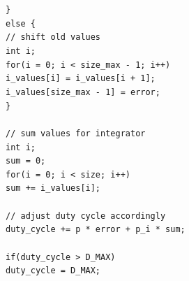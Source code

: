 \documentclass[a4paper, 12pt]{article}
\begin{document}
\begin{appendices}
	\texttt{\hspace*{2em}\}} \\\noindent
	\texttt{\hspace*{2em}else \{ \\\noindent}
	\texttt{\hspace*{3em}// shift old values} \\\noindent
	\texttt{\hspace*{3em}int i;} \\\noindent
	\texttt{\hspace*{3em}for(i = 0; i < size\_max - 1; i++)} \\\noindent
	\texttt{\hspace*{3em}i\_values[i] = i\_values[i + 1];} \\\noindent
	\texttt{\hspace*{3em}i\_values[size\_max - 1] = error;} \\\noindent
	\texttt{\hspace*{2em}\}} \\\noindent
	\texttt{ \\\noindent}
	\texttt{\hspace*{2em}// sum values for integrator} \\\noindent
	\texttt{\hspace*{2em}int i;} \\\noindent
	\texttt{\hspace*{2em}sum = 0;} \\\noindent
	\texttt{\hspace*{2em}for(i = 0; i < size; i++)} \\\noindent
	\texttt{\hspace*{2em}sum += i\_values[i];} \\\noindent
	\texttt{\hspace*{2em}\\\noindent}
	\texttt{\hspace*{2em}// adjust duty cycle accordingly} \\\noindent
	\texttt{\hspace*{2em}duty\_cycle += p * error + p\_i * sum;} \\\noindent
	\texttt{ \\\noindent}
	\texttt{\hspace*{2em}if(duty\_cycle > D\_MAX)} \\\noindent
	\texttt{\hspace*{3em}duty\_cycle = D\_MAX;} \\\noindent
	\texttt{ \\\noindent}

\end{appendices}
\end{document}
